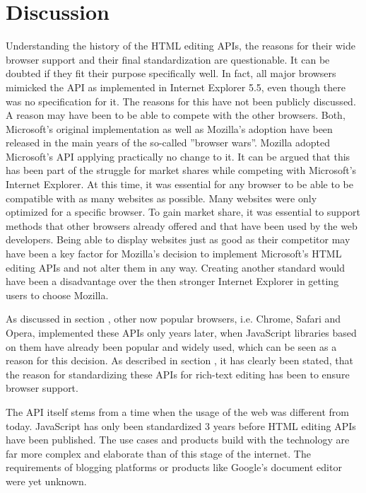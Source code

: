 
\section{Discussion}

Understanding the history of the HTML editing APIs, the reasons for their wide browser support and their final standardization are questionable. It can be doubted if they fit their purpose specifically well. In fact, all major browsers mimicked the API as implemented in Internet Explorer 5.5, even though there was no specification for it. The reasons for this have not been publicly discussed. A reason may have been to be able to compete with the other browsers. Both, Microsoft's original implementation as well as Mozilla's adoption have been released in the main years of the so-called ''browser wars''. Mozilla adopted Microsoft's API applying practically no change to it. It can be argued that this has been part of the struggle for market shares while competing with Microsoft's Internet Explorer. At this time, it was essential for any browser to be able to be compatible with as many websites as possible. Many websites were only optimized for a specific browser. To gain market share, it was essential to support methods that other browsers already offered and that have been used by the web developers. Being able to display websites just as good as their competitor may have been a key factor for Mozilla's decision to implement Microsoft's HTML editing APIs and not alter them in any way. Creating another standard would have been a disadvantage over the then stronger Internet Explorer in getting users to choose Mozilla. 

As discussed in section , other now popular browsers, i.e. Chrome, Safari and Opera, implemented these APIs only years later, when JavaScript libraries based on them have already been popular and widely used, which can be seen as a reason for this decision. As described in section , it has clearly been stated, that the reason for standardizing these APIs for rich-text editing has been to ensure browser support.

The API itself stems from a time when the usage of the web was different from today. JavaScript has only been standardized 3 years before HTML editing APIs have been published. The use cases and products build with the technology are far more complex and elaborate than of this stage of the internet. The requirements of blogging platforms or products like Google's document editor were yet unknown. %

